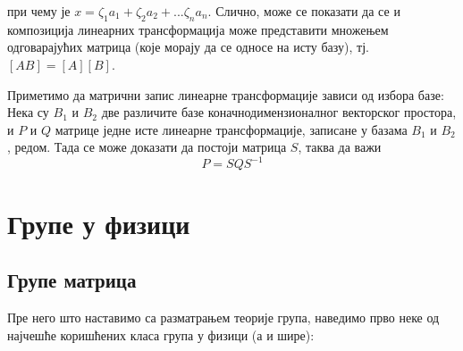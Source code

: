\documentclass{report}
\theoremstyle{plain}
\theoremstyle{definition}
\begin{document}
при чему је $x = \zeta_1 a_1 + \zeta_2 a_2 + ... \zeta_n a_n$. Слично, може се показати да се и композиција линеарних трансформација може представити множењем одговарајућих матрица (које морају да се односе на исту базу), тј. $[AB] = [A][B]$.

Приметимо да матрични запис линеарне трансформације зависи од избора базе:\\
Нека су $B_1$ и $B_2$ две различите базе коначнодимензионалног векторског простора, и $P$ и $Q$ матрице једне исте линеарне трансформације, записане у базама $B_1$ и $B_2$, редом. Тада се може доказати да постоји матрица $S$, таква да важи
$$P = SQS^{-1}$$

\chapter{Групе у физици}

\section{Групе матрица}

Пре него што наставимо са разматрањем теорије група, наведимо прво неке од најчешће коришћених класа група у физици (а и шире):
\end{document}
